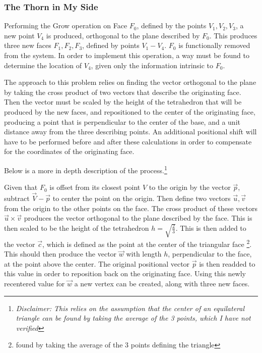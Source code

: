 \documentclass[letterpaper,oneside,titlepage]{article}
\begin{document}
\subsubsection*{The Thorn in My Side}
Performing the Grow operation on Face $F_0$, defined by the points $V_1, V_2, V_3$, a new point $V_4$ is produced, orthogonal to the plane described by $F_0$.  This produces three new faces $F_1, F_2, F_3$, defined by points $V_1 - V_4$.  $F_0$ is functionally removed from the system.  In order to implement this operation, a way must be found to determine the location of $V_4$, given only the information intrinsic to $F_0$.
\par
The approach to this problem relies on finding the vector orthogonal to the plane by taking the cross product of two vectors that describe the originating face.  Then the vector must be scaled by the height of the tetrahedron that will be produced by the new faces, and repositioned to the center of the originating face, producing a point that is perpendicular to the center of the base, and a unit distance away from the three describing points.  An additional positional shift will have to be performed before and after these calculations in order to compensate for the coordinates of the originating face.
\par
Below is a more in depth description of the process.\footnote{\emph{Disclaimer: This relies on the assumption that the center of an equilateral triangle can be found by taking the average of the 3 points, which I have not verified}}
\par
Given that $F_0$ is offset from its closest point $V$ to the origin by the vector $\vec{p}$, subtract $\vec{V} - \vec{p}$ to center the point on the origin.  Then define two vectors $\vec{u}, \vec{v}$ from the origin to the other points on the face.  The cross product of these vectors $\vec{u} \times \vec{v}$ produces the vector orthogonal to the plane described by the face.  This is then scaled to be the height of the tetrahedron $h = \sqrt{\frac{2}{3}}$.  This is then added to the vector $\vec{c}$, which is defined as the point at the center of the triangular face \footnote{found by taking the average of the 3 points defining the triangle}.  This should then produce the vector $\vec{w}$ with length $h$, perpendicular to the face, at the point above the center.  The original positional vector $\vec{p}$ is then readded to this value in order to reposition back on the originating face.  Using this newly recentered value for $\vec{w}$ a new vertex can be created, along with three new faces.
\end{document}
